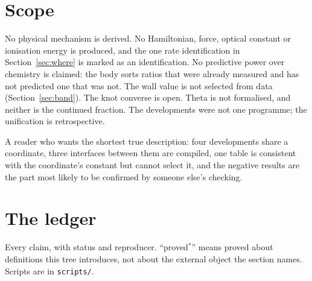 \documentclass[11pt]{article}
\renewcommand{\_}{\origunderscore\allowbreak}
\begin{document}
\section{Scope}\label{sec:scope}

No physical mechanism is derived. No Hamiltonian, force, optical constant or ionisation energy is
produced, and the one rate identification in Section~\ref{sec:where} is marked as an
identification. No predictive power over chemistry is claimed: the body sorts ratios that were
already measured and has not predicted one that was not. The wall value is not selected from data
(Section~\ref{sec:band}). The knot converse is open. Theta is not formalised, and neither is the
continued fraction. The developments were not one programme; the unification is retrospective.

A reader who wants the shortest true description: four developments share a coordinate, three
interfaces between them are compiled, one table is consistent with the coordinate's constant but
cannot select it, and the negative results are the part most likely to be confirmed by someone
else's checking.

\appendix
\section{The ledger}\label{app:ledger}

Every claim, with status and reproducer. ``proved${}^*$'' means proved about definitions this tree
introduces, not about the external object the section names. Scripts are in \texttt{scripts/}.
\end{document}
